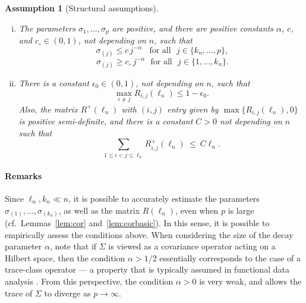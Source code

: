 \documentclass[aos,preprint]{imsart}
\numberwithin{equation}{section}
\theoremstyle{plain}
\newtheorem{assumption}{Assumption}[section]
\newcommand{\e}{\epsilon}
\newcommand{\ts}{\textstyle}
\newcommand{\1}{{\bf{1}}}
\newcommand{\0}{\mathbf{0}}
\def\cp{\citep}
\begin{document}
\begin{assumption}[Structural assumptions]\label{A:cor}
~\\[-0.3cm]
\begin{enumerate}[(i).]
 \item  The parameters $\sigma_1,\dots,\sigma_p$ are positive, and there are positive constants $\alpha$, $c$, and $c_{\circ}\in(0,1)$, not depending on $n$, such that
\begin{equation}\label{eqn:varcond1}
\ \sigma_{(j)} \leq c \, j^{-\alpha} \ \ \ \ \text{for all} \ \ \ j\in\{k_n,\dots,p\},
\end{equation}
\vspace{-0.5cm}
\begin{equation}\label{eqn:varcond2}
\ \sigma_{(j)} \geq \ts c_{\circ} \, j^{-\alpha}\  \ \ \text{for all} \ \ \ j\in\{1,\dots,k_n\}.
\end{equation}

\item There is a constant $\e_0\in(0,1)$, not depending on $n$, such that 
\begin{equation}\label{eqn:cormax}
\max_{i\neq j}R_{i,j}(\ell_n)\leq 1-\e_0.
\end{equation}
Also, the matrix $R^+(\ell_n)$ with $(i,j)$ entry given by $\max\{R_{i,j}(\ell_n),0\}$ is positive semi-definite, and there is
%
 a constant $C>0$ not depending on $n$ such that
\begin{equation}\label{eqn:corbound}
\sum_{1\leq i<j\leq \ell_n}\!\!R_{i,j}^+(\ell_n) \ \leq \ C \ell_n.
\end{equation}
%
\end{enumerate}
%
\end{assumption}


\paragraph{Remarks}
Since $\ell_n,k_n\ll n$, it is possible to accurately estimate the parameters $\sigma_{(1)},\dots,\sigma_{(k_n)}$, as well as the matrix $R(\ell_n)$, even when $p$ is large (cf.~Lemmas~\ref{lem:cor} and~\ref{lem:corbasic}). In this sense, it is possible to empirically assess the conditions above.
When considering the size of the decay parameter $\alpha$, note that if $\Sigma$ is viewed as a covariance operator acting on a Hilbert space, then the condition $\alpha>1/2$ essentially corresponds to the case of a trace-class operator --- a property that  is typically assumed in functional data analysis \cp{Hsing2015}.  From this perspective, the condition $\alpha>0$ is very weak, and allows the trace of $\Sigma$ to diverge as $p\to\infty$. 
\end{document}

